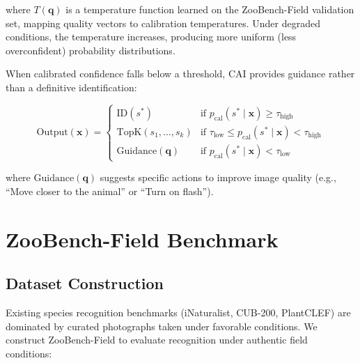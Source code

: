 \documentclass[11pt,a4paper]{article}
\begin{document}
\noindent where $T(\mathbf{q})$ is a temperature function learned on the ZooBench-Field validation set, mapping quality vectors to calibration temperatures.
Under degraded conditions, the temperature increases, producing more uniform (less overconfident) probability distributions.

When calibrated confidence falls below a threshold, CAI provides guidance rather than a definitive identification:

\begin{equation}
    \text{Output}(\mathbf{x}) = \begin{cases}
        \text{ID}(s^*) & \text{if } p_{\text{cal}}(s^* \mid \mathbf{x}) \geq \tau_{\text{high}} \\
        \text{TopK}(s_1, \ldots, s_k) & \text{if } \tau_{\text{low}} \leq p_{\text{cal}}(s^* \mid \mathbf{x}) < \tau_{\text{high}} \\
        \text{Guidance}(\mathbf{q}) & \text{if } p_{\text{cal}}(s^* \mid \mathbf{x}) < \tau_{\text{low}}
    \end{cases}
\end{equation}

\noindent where $\text{Guidance}(\mathbf{q})$ suggests specific actions to improve image quality (e.g., ``Move closer to the animal'' or ``Turn on flash'').

\section{ZooBench-Field Benchmark}
\label{sec:benchmark}

\subsection{Dataset Construction}

Existing species recognition benchmarks (iNaturalist, CUB-200, PlantCLEF) are dominated by curated photographs taken under favorable conditions.
We construct ZooBench-Field to evaluate recognition under authentic field conditions:
\end{document}
